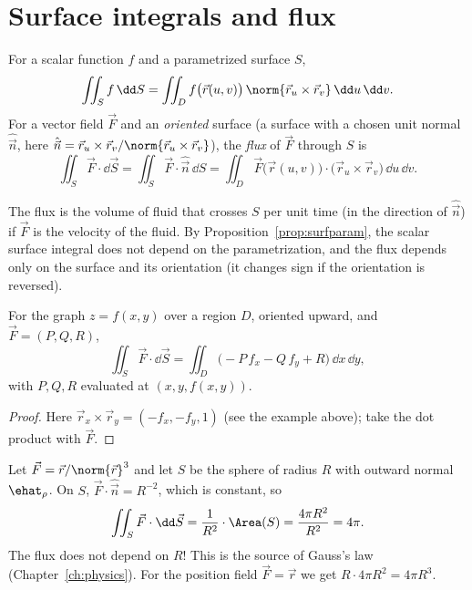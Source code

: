 \section{Surface integrals and flux}

\begin{definition}
For a scalar function $f$ and a parametrized surface $S$,
\[
\iint_Sf\,\dd S=\iint_Df\bigl(\vec r(u,v)\bigr)\,\norm{\vec r_u\times\vec r_v}\,\dd u\,\dd v .
\]
For a vector field $\vec F$ and an \emph{oriented} surface (a surface with a chosen unit normal $\hat{\vec n}$, here $\hat{\vec n}=\vec r_u\times\vec r_v/\norm{\vec r_u\times\vec r_v}$), the \emph{flux} of $\vec F$ through $S$ is
\[
\iint_S\vec F\cdot\dd\vec S=\iint_S\vec F\cdot\hat{\vec n}\,\dd S=\iint_D\vec F\bigl(\vec r(u,v)\bigr)\cdot\bigl(\vec r_u\times\vec r_v\bigr)\,\dd u\,\dd v .
\]
\end{definition}

The flux is the volume of fluid that crosses $S$ per unit time (in the direction of $\hat{\vec n}$) if $\vec F$ is the velocity of the fluid. By Proposition~\ref{prop:surfparam}, the scalar surface integral does not depend on the parametrization, and the flux depends only on the surface and its orientation (it changes sign if the orientation is reversed).

\begin{theorem}\label{thm:fluxgraph}
For the graph $z=f(x,y)$ over a region $D$, oriented upward, and $\vec F=(P,Q,R)$,
\[
\iint_S\vec F\cdot\dd\vec S=\iint_D\bigl(-P\,f_x-Q\,f_y+R\bigr)\,\dd x\,\dd y,
\]
with $P,Q,R$ evaluated at $(x,y,f(x,y))$.
\end{theorem}

\begin{proof}
Here $\vec r_x\times\vec r_y=(-f_x,-f_y,1)$ (see the example above); take the dot product with $\vec F$.
\end{proof}

\begin{example}
Let $\vec F=\vec r/\norm{\vec r}^3$ and let $S$ be the sphere of radius $R$ with outward normal $\ehat_\rho$. On $S$, $\vec F\cdot\hat{\vec n}=R^{-2}$, which is constant, so
\[
\iint_S\vec F\cdot\dd\vec S=\frac1{R^2}\cdot\Area(S)=\frac{4\pi R^2}{R^2}=4\pi .
\]
The flux does not depend on $R$! This is the source of Gauss's law (Chapter~\ref{ch:physics}). For the position field $\vec F=\vec r$ we get $R\cdot4\pi R^2=4\pi R^3$.
\end{example}

